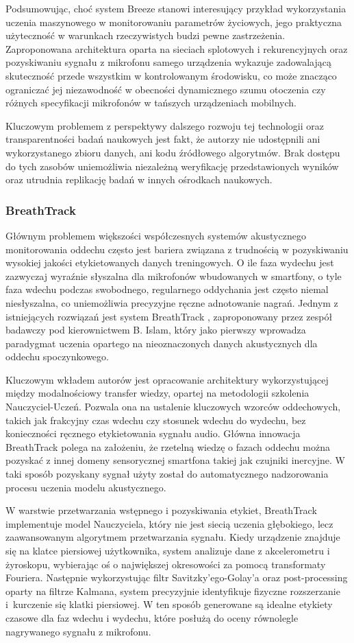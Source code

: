 Podsumowując, choć system Breeze stanowi interesujący przykład wykorzystania uczenia maszynowego w monitorowaniu parametrów życiowych, jego praktyczna użyteczność w warunkach rzeczywistych budzi pewne zastrzeżenia. Zaproponowana architektura oparta na sieciach splotowych i rekurencyjnych oraz pozyskiwaniu sygnału z mikrofonu samego urządzenia wykazuje zadowalającą skuteczność przede wszystkim w kontrolowanym środowisku, co może znacząco ograniczać jej niezawodność w obecności dynamicznego szumu otoczenia czy różnych specyfikacji mikrofonów w tańszych urządzeniach mobilnych.

Kluczowym problemem z perspektywy dalszego rozwoju tej technologii oraz transparentności badań naukowych jest fakt, że autorzy nie udostępnili ani wykorzystanego zbioru danych, ani kodu źródłowego algorytmów. Brak dostępu do tych zasobów uniemożliwia niezależną weryfikację przedstawionych wyników oraz utrudnia replikację badań w innych ośrodkach naukowych.
\subsubsection{BreathTrack}
Głównym problemem większości współczesnych systemów akustycznego monitorowania oddechu często jest bariera związana z trudnością w pozyskiwaniu wysokiej jakości etykietowanych danych treningowych. O ile faza wydechu jest zazwyczaj wyraźnie słyszalna dla mikrofonów wbudowanych w smartfony, o tyle faza wdechu podczas swobodnego, regularnego oddychania jest często niemal niesłyszalna, co uniemożliwia precyzyjne ręczne adnotowanie nagrań. Jednym z istniejących rozwiązań jest system BreathTrack \cite{10.1145/3478123}, zaproponowany przez zespół badawczy pod kierownictwem B. Islam, który jako pierwszy wprowadza paradygmat uczenia opartego na nieoznaczonych danych akustycznych dla oddechu spoczynkowego.

Kluczowym wkładem autorów jest opracowanie architektury wykorzystującej między modalnościowy transfer wiedzy, opartej na metodologii szkolenia Nauczyciel-Uczeń. Pozwala ona na ustalenie kluczowych wzorców oddechowych, takich jak frakcyjny czas wdechu czy stosunek wdechu do wydechu, bez konieczności ręcznego etykietowania sygnału audio. Główna innowacja BreathTrack polega na założeniu, że rzetelną wiedzę o fazach oddechu można pozyskać z innej domeny sensorycznej smartfona takiej jak czujniki inercyjne. W taki sposób pozyskany sygnał użyty został do automatycznego nadzorowania procesu uczenia modelu akustycznego.

W warstwie przetwarzania wstępnego i pozyskiwania etykiet, BreathTrack implementuje model Nauczyciela, który nie jest siecią uczenia głębokiego, lecz zaawansowanym algorytmem przetwarzania sygnału. Kiedy urządzenie znajduje się na klatce piersiowej użytkownika, system analizuje dane z akcelerometru i żyroskopu, wybierając oś o największej okresowości za pomocą transformaty Fouriera. Następnie wykorzystując filtr Savitzky'ego-Golay'a \cite{5888646} oraz post-processing oparty na filtrze Kalmana, system precyzyjnie identyfikuje fizyczne rozszerzanie i~kurczenie się klatki piersiowej. W ten sposób generowane są idealne etykiety czasowe dla faz wdechu i wydechu, które posłużą do oceny równolegle nagrywanego sygnału z mikrofonu.

